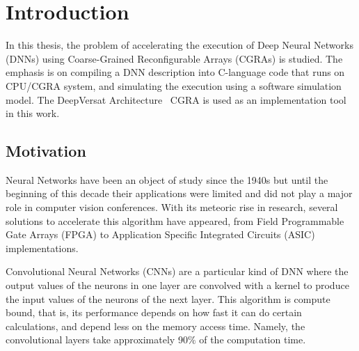 
\chapter{Introduction}
\label{chapter:introduction}




In this thesis, the problem of accelerating the execution of Deep Neural Networks (DNNs) using Coarse-Grained Reconfigurable Arrays (CGRAs) is studied.
The emphasis is on compiling a DNN description into C-language code that runs on
CPU/CGRA system, and simulating the execution using a software simulation model.
The DeepVersat Architecture~\cite{valter:deepversat} CGRA is used as an
implementation tool in this work.


\section{Motivation}
\label{section:motivation}

Neural Networks have been an object of study since the 1940s but until the
beginning of this decade their applications were limited and did not play a
major role in computer vision conferences. With its meteoric rise in research,
several solutions to accelerate this algorithm have appeared, from Field Programmable Gate Arrays (FPGA) to
Application Specific Integrated Circuits (ASIC) implementations.

Convolutional Neural Networks (CNNs) are a particular kind of DNN where the output
values of the neurons in one layer are convolved with a kernel to produce the
input values of the neurons of the next layer. This algorithm is compute bound,
that is, its performance depends on how fast it can do certain calculations, and
depend less on the memory access time. Namely, the convolutional layers take
approximately 90$\%$ of the computation time.

